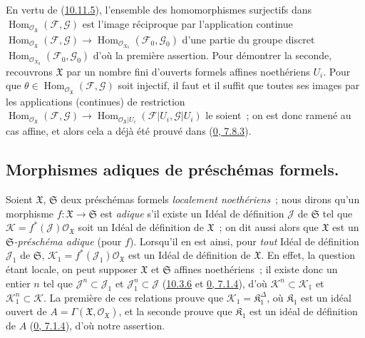 En vertu de (\hyperref[I.10.11.5-fr]{10.11.5}), l'ensemble des
homomorphismes surjectifs dans
$\operatorname{Hom}_{\mathscr{O}_{\mathfrak{X}}}
(\mathscr{F},\mathscr{G})$ est l'image réciproque par l'application
continue
$\operatorname{Hom}_{\mathscr{O}_{\mathfrak{X}}}
(\mathscr{F},\mathscr{G})\to
\operatorname{Hom}_{\mathscr{O}_{X_0}}(\mathscr{F}_0,\mathscr{G}_0)$
d'une partie du groupe discret
$\operatorname{Hom}_{\mathscr{O}_{X_0}}(\mathscr{F}_0,\mathscr{G}_0)$
d'où la première assertion. Pour démontrer la seconde, recouvrons
$\mathfrak{X}$ par un nombre fini d'ouverts formels affines noethériens
$U_i$. Pour que
$\theta\in\operatorname{Hom}_{\mathscr{O}_{\mathfrak{X}}}
(\mathscr{F},\mathscr{G})$ soit injectif, il faut et il suffit que toutes
ses images par les applications (continues) de restriction
$\operatorname{Hom}_{\mathscr{O}_{\mathfrak{X}}}
(\mathscr{F},\mathscr{G})\to
\operatorname{Hom}_{\mathscr{O}_{\mathfrak{X}}|U_i}
(\mathscr{F}|U_i,\mathscr{G}|U_i)$ le soient~; on est donc ramené au cas
affine, et alors cela a déjà été prouvé dans
(\hyperref[0.7.8.3-fr]{0, 7.8.3}).


\subsection{Morphismes adiques de préschémas formels.}
\label{subsection:I.10.12-fr}

\begin{env}[10.12.1]
\label{I.10.12.1-fr}
Soient $\mathfrak{X}$, $\mathfrak{S}$ deux préschémas formels
\emph{localement noethériens}~; nous dirons qu'un morphisme
$f:\mathfrak{X}\to\mathfrak{S}$ est \emph{adique} s'il existe un Idéal
de définition $\mathscr{J}$ de $\mathfrak{S}$ tel que
$\mathscr{K}=f^*(\mathscr{J})\mathscr{O}_{\mathfrak{X}}$ soit un Idéal de
définition de $\mathfrak{X}$~; on dit aussi alors que $\mathfrak{X}$ est
un \emph{$\mathfrak{S}$-préschéma adique} (pour $f$). Lorsqu'il en est
ainsi, pour \emph{tout} Idéal de définition $\mathscr{J}_1$ de
$\mathfrak{S}$,
$\mathscr{K}_1=f^*(\mathscr{J}_1)\mathscr{O}_{\mathfrak{X}}$ est un Idéal
de définition de $\mathfrak{X}$. En effet, la question étant locale, on
peut supposer $\mathfrak{X}$ et $\mathfrak{S}$ affines noethériens~; il
existe donc un entier $n$ tel que $\mathscr{J}^n\subset\mathscr{J}_1$ et
$\mathscr{J}_1^n\subset\mathscr{J}$
(\hyperref[I.10.3.6-fr]{10.3.6} et
\hyperref[0.7.1.4-fr]{0, 7.1.4}), d'où
$\mathscr{K}^n\subset\mathscr{K}_1$ et
$\mathscr{K}_1^n\subset\mathscr{K}$. La première de ces relations prouve
que $\mathscr{K}_1=\mathfrak{K}_1^\Delta$, où $\mathfrak{K}_1$ est un
idéal ouvert de
$A=\Gamma(\mathfrak{X},\mathscr{O}_{\mathfrak{X}})$, et la seconde prouve
que $\mathfrak{K}_1$ est un idéal de définition de $A$
(\hyperref[0.7.1.4-fr]{0, 7.1.4}), d'où notre assertion.
\end{env}

